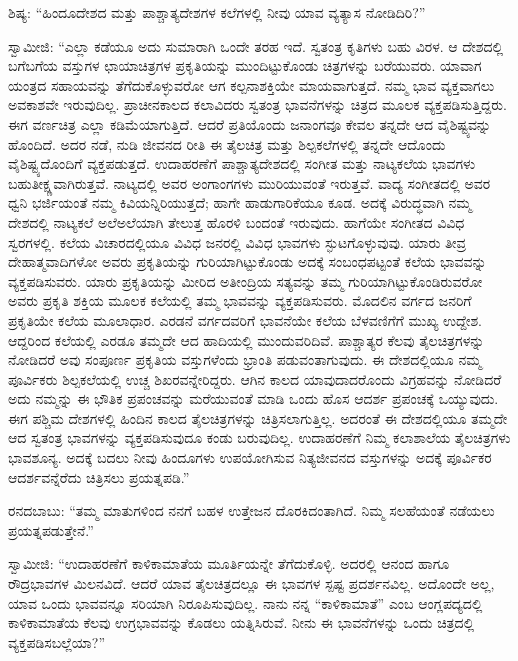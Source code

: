  ಶಿಷ್ಯ: “ಹಿಂದೂದೇಶದ ಮತ್ತು ಪಾಶ್ಚಾತ್ಯದೇಶಗಳ ಕಲೆಗಳಲ್ಲಿ ನೀವು ಯಾವ ವ್ಯತ್ಯಾಸ ನೋಡಿದಿರಿ?” 

 ಸ್ವಾಮೀಜಿ: “ಎಲ್ಲಾ ಕಡೆಯೂ ಅದು ಸುಮಾರಾಗಿ ಒಂದೇ ತರಹ ಇದೆ. ಸ್ವತಂತ್ರ ಕೃತಿಗಳು ಬಹು ವಿರಳ. ಆ ದೇಶದಲ್ಲಿ ಬಗೆಬಗೆಯ ವಸ್ತುಗಳ ಛಾಯಾಚಿತ್ರಗಳ ಪ್ರಕೃತಿಯನ್ನು ಮುಂದಿಟ್ಟುಕೊಂಡು ಚಿತ್ರಗಳನ್ನು ಬರೆಯುವರು. ಯಾವಾಗ ಯಂತ್ರದ ಸಹಾಯವನ್ನು ತೆಗೆದುಕೊಳ್ಳುವರೋ ಆಗ ಕಲ್ಪನಾಶಕ್ತಿಯೇ ಮಾಯವಾಗುತ್ತದೆ. ನಮ್ಮ ಭಾವ ವ್ಯಕ್ತವಾಗಲು ಅವಕಾಶವೇ ಇರುವುದಿಲ್ಲ. ಪ್ರಾಚೀನಕಾಲದ ಕಲಾವಿದರು ಸ್ವತಂತ್ರ ಭಾವನೆಗಳನ್ನು ಚಿತ್ರದ ಮೂಲಕ ವ್ಯಕ್ತಪಡಿಸುತ್ತಿದ್ದರು. ಈಗ ವರ್ಣಚಿತ್ರ ಎಲ್ಲಾ ಕಡಿಮೆಯಾಗುತ್ತಿದೆ. ಆದರೆ ಪ್ರತಿಯೊಂದು ಜನಾಂಗವೂ ಕೇವಲ ತನ್ನದೇ ಆದ ವೈಶಿಷ್ಟ್ಯವನ್ನು ಹೊಂದಿದೆ. ಅದರ ನಡೆ, ನುಡಿ ಜೀವನದ ರೀತಿ ಈ ತೈಲಚಿತ್ರ ಮತ್ತು ಶಿಲ್ಪಕಲೆಗಳಲ್ಲಿ ತನ್ನದೇ ಆದೊಂದು ವೈಶಿಷ್ಟ್ಯದೊಂದಿಗೆ ವ್ಯಕ್ತಪಡುತ್ತದೆ. ಉದಾಹರಣೆಗೆ ಪಾಶ್ಚಾತ್ಯದೇಶದಲ್ಲಿ ಸಂಗೀತ ಮತ್ತು ನಾಟ್ಯಕಲೆಯ ಭಾವಗಳು ಬಹುತೀಕ್ಷ್ಣವಾಗಿರುತ್ತವೆ. ನಾಟ್ಯದಲ್ಲಿ ಅವರ ಅಂಗಾಂಗಗಳು ಮುರಿಯುವಂತೆ ಇರುತ್ತವೆ. ವಾದ್ಯ ಸಂಗೀತದಲ್ಲಿ ಅವರ ಧ್ವನಿ ಭರ್ಜಿಯಂತೆ ನಮ್ಮ ಕಿವಿಯನ್ನಿರಿಯುತ್ತದೆ; ಹಾಗೇ ಹಾಡುಗಾರಿಕೆಯೂ ಕೂಡ. ಅದಕ್ಕೆ ವಿರುದ್ಧವಾಗಿ ನಮ್ಮ ದೇಶದಲ್ಲಿ ನಾಟ್ಯಕಲೆ ಅಲೆಅಲೆಯಾಗಿ ತೇಲುತ್ತ ಹೊರಳಿ ಬಂದಂತೆ ಇರುವುದು. ಹಾಗೆಯೇ ಸಂಗೀತದ ವಿವಿಧ ಸ್ವರಗಳಲ್ಲಿ. ಕಲೆಯ ವಿಚಾರದಲ್ಲಿಯೂ ವಿವಿಧ ಜನರಲ್ಲಿ ವಿವಿಧ ಭಾವಗಳು ಸ್ಫುಟಗೊಳ್ಳುವುವು. ಯಾರು ತೀವ್ರ ದೇಹಾತ್ಮವಾದಿಗಳೋ ಅವರು ಪ್ರಕೃತಿಯನ್ನು ಗುರಿಯಾಗಿಟ್ಟುಕೊಂಡು ಅದಕ್ಕೆ ಸಂಬಂಧಪಟ್ಟಂತೆ ಕಲೆಯ ಭಾವವನ್ನು ವ್ಯಕ್ತಪಡಿಸುವರು. ಯಾರು ಪ್ರಕೃತಿಯನ್ನು ಮೀರಿದ ಅತೀಂದ್ರಿಯ ಸತ್ಯವನ್ನು ತಮ್ಮ ಗುರಿಯಾಗಿಟ್ಟುಕೊಂಡಿರುವರೋ ಅವರು ಪ್ರಕೃತಿ ಶಕ್ತಿಯ ಮೂಲಕ ಕಲೆಯಲ್ಲಿ ತಮ್ಮ ಭಾವವನ್ನು ವ್ಯಕ್ತಪಡಿಸುವರು. ಮೊದಲಿನ ವರ್ಗದ ಜನರಿಗೆ ಪ್ರಕೃತಿಯೇ ಕಲೆಯ ಮೂಲಾಧಾರ. ಎರಡನೆ ವರ್ಗದವರಿಗೆ ಭಾವನೆಯೇ ಕಲೆಯ ಬೆಳವಣಿಗೆಗೆ ಮುಖ್ಯ ಉದ್ದೇಶ. ಆದ್ದರಿಂದ ಕಲೆಯಲ್ಲಿ ಎರಡೂ ತಮ್ಮದೇ ಆದ ಹಾದಿಯಲ್ಲಿ ಮುಂದುವರಿದಿವೆ. ಪಾಶ್ಚಾತ್ಯರ ಕೆಲವು ತೈಲಚಿತ್ರಗಳನ್ನು ನೋಡಿದರೆ ಅವು ಸಂಪೂರ್ಣ ಪ್ರಕೃತಿಯ ವಸ್ತುಗಳೆಂದು ಭ್ರಾಂತಿ ಪಡುವಂತಾಗುವುದು. ಈ ದೇಶದಲ್ಲಿಯೂ ನಮ್ಮ ಪೂರ್ವಿಕರು ಶಿಲ್ಪಕಲೆಯಲ್ಲಿ ಉಚ್ಚ ಶಿಖರವನ್ನೇರಿದ್ದರು. ಆಗಿನ ಕಾಲದ ಯಾವುದಾದರೊಂದು ವಿಗ್ರಹವನ್ನು ನೋಡಿದರೆ ಅದು ನಮ್ಮನ್ನು ಈ ಭೌತಿಕ ಪ್ರಪಂಚವನ್ನು ಮರೆಯುವಂತೆ ಮಾಡಿ ಒಂದು ಹೊಸ ಆದರ್ಶ ಪ್ರಪಂಚಕ್ಕೆ ಒಯ್ಯುವುದು. ಈಗ ಪಶ್ಚಿಮ ದೇಶಗಳಲ್ಲಿ ಹಿಂದಿನ ಕಾಲದ ತೈಲಚಿತ್ರಗಳನ್ನು ಚಿತ್ರಿಸಲಾಗುತ್ತಿಲ್ಲ. ಅದರಂತೆ ಈ ದೇಶದಲ್ಲಿಯೂ ತಮ್ಮದೇ ಆದ ಸ್ವತಂತ್ರ ಭಾವಗಳನ್ನು ವ್ಯಕ್ತಪಡಿಸುವುದೂ ಕಂಡು ಬರುವುದಿಲ್ಲ. ಉದಾಹರಣೆಗೆ ನಿಮ್ಮ ಕಲಾಶಾಲೆಯ ತೈಲಚಿತ್ರಗಳು ಭಾವಶೂನ್ಯ. ಅದಕ್ಕೆ ಬದಲು ನೀವು ಹಿಂದೂಗಳು ಉಪಯೋಗಿಸುವ ನಿತ್ಯಜೀವನದ ವಸ್ತುಗಳನ್ನು ಅದಕ್ಕೆ ಪೂರ್ವಿಕರ ಆದರ್ಶವನ್ನೆರೆದು ಚಿತ್ರಿಸಲು ಪ್ರಯತ್ನಪಡಿ.” 

 ರನದಬಾಬು: “ತಮ್ಮ ಮಾತುಗಳಿಂದ ನನಗೆ ಬಹಳ ಉತ್ತೇಜನ ದೊರಕಿದಂತಾಗಿದೆ. ನಿಮ್ಮ ಸಲಹೆಯಂತೆ ನಡೆಯಲು ಪ್ರಯತ್ನಪಡುತ್ತೇನೆ.” 

 ಸ್ವಾಮೀಜಿ: “ಉದಾಹರಣೆಗೆ ಕಾಳಿಕಾಮಾತೆಯ ಮೂರ್ತಿಯನ್ನೇ ತೆಗೆದುಕೊಳ್ಳಿ. ಅದರಲ್ಲಿ ಆನಂದ ಹಾಗೂ ರೌದ್ರಭಾವಗಳ ಮಿಲನವಿದೆ. ಆದರೆ ಯಾವ ತೈಲಚಿತ್ರದಲ್ಲೂ ಈ ಭಾವಗಳ ಸ್ಪಷ್ಟ ಪ್ರದರ್ಶನವಿಲ್ಲ. ಅದೊಂದೇ ಅಲ್ಲ, ಯಾವ ಒಂದು ಭಾವವನ್ನೂ ಸರಿಯಾಗಿ ನಿರೂಪಿಸುವುದಿಲ್ಲ. ನಾನು ನನ್ನ “ಕಾಳಿಕಾಮಾತೆ” ಎಂಬ ಆಂಗ್ಲಪದ್ಯದಲ್ಲಿ ಕಾಳಿಕಾಮಾತೆಯ ಕೆಲವು ಉಗ್ರಭಾವವನ್ನು ಕೊಡಲು ಯತ್ನಿಸಿರುವೆ. ನೀನು ಈ ಭಾವನೆಗಳನ್ನು ಒಂದು ಚಿತ್ರದಲ್ಲಿ ವ್ಯಕ್ತಪಡಿಸಬಲ್ಲೆಯಾ?” 

